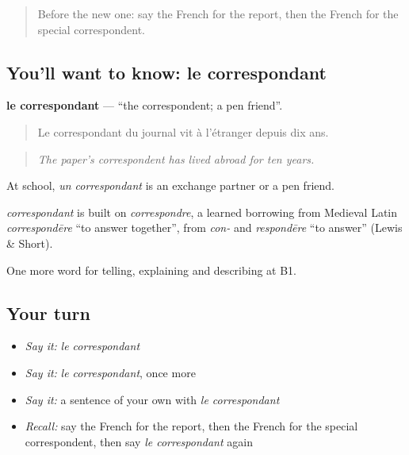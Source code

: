\label{lesson:FR-C281-correspondant}



\begin{quote}
Before the new one: say the French for the report, then the French for the special correspondent.
\end{quote}

\subsection*{You'll want to know: le correspondant}
\textbf{le correspondant} — \textquotedblleft{}the correspondent; a pen friend\textquotedblright{}.

\begin{quote}
Le correspondant du journal vit à l'étranger depuis dix ans.
\end{quote}

\begin{quote}
\emph{The paper's correspondent has lived abroad for ten years.}
\end{quote}

At school, \emph{un correspondant} is an exchange partner or a pen friend.

\begin{cousinweb}
\emph{correspondant} is built on \emph{correspondre}, a learned borrowing from Medieval Latin \emph{correspondēre} \textquotedblleft{}to answer together\textquotedblright{}, from \emph{con-} and \emph{respondēre} \textquotedblleft{}to answer\textquotedblright{} (Lewis \& Short).
\end{cousinweb}

\begin{grammarlens}[title={What you've built}]
One more word for telling, explaining and describing at B1.
\end{grammarlens}

\subsection*{Your turn}
\begin{itemize}
\raggedright
  \item \emph{Say it:} \emph{le correspondant}
  \item \emph{Say it:} \emph{le correspondant}, once more
  \item \emph{Say it:} a sentence of your own with \emph{le correspondant}
  \item \emph{Recall:} say the French for the report, then the French for the special correspondent, then say \emph{le correspondant} again
\end{itemize}

